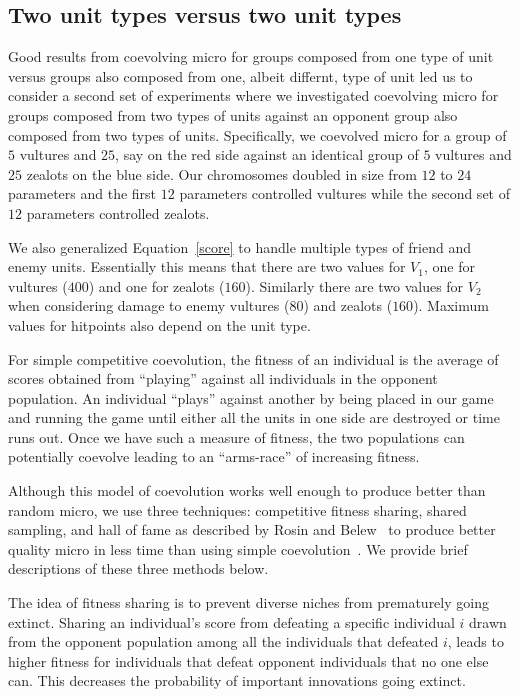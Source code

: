 \documentclass[conference,10pt]{IEEEtran}
\begin{document}
\subsection{Two unit types versus two unit types}

Good results from coevolving micro for groups composed from one type
of unit versus groups also composed from one, albeit differnt, type of
unit led us to consider a second set of experiments where we
investigated coevolving micro for groups composed from two types of
units against an opponent group also composed from two types of
units. Specifically, we coevolved micro for a group of $5$ vultures
and $25$, say on the red side against an identical group of $5$
vultures and $25$ zealots on the blue side. Our chromosomes doubled in
size from $12$ to $24$ parameters and the first $12$ parameters
controlled vultures while the second set of $12$ parameters controlled
zealots.

We also generalized Equation~\ref{score} to handle multiple types of
friend and enemy units. Essentially this means that there are two
values for $V_1$, one for vultures ($400$) and one for zealots
($160$). Similarly there are two values for $V_2$ when considering
damage to enemy vultures ($80$) and zealots ($160$). Maximum values
for hitpoints also depend on the unit type.
%

For simple competitive coevolution, the fitness of an individual is
the average of scores obtained from “playing” against all individuals
in the opponent population. An individual “plays” against another by
being placed in our game and running the game until either all the
units in one side are destroyed or time runs out. Once we have such a
measure of fitness, the two populations can potentially coevolve
leading to an “arms-race” of increasing fitness.

Although this model of coevolution works well enough to produce better
than random micro, we use three techniques: competitive
fitness sharing, shared sampling, and hall of fame as described by
Rosin and Belew~\cite{NMFCC97} to produce better quality micro in less
time than using simple coevolution~\cite{hillis1990co}. We provide
brief descriptions of these three methods below.
%

The idea of fitness sharing is to prevent diverse niches from
prematurely going extinct. Sharing an individual’s score from
defeating a specific individual $i$ drawn from the opponent population
among all the individuals that defeated $i$, leads to higher fitness
for individuals that defeat opponent individuals that no one else
can. This decreases the probability of important innovations going
extinct.
 
\end{document}
